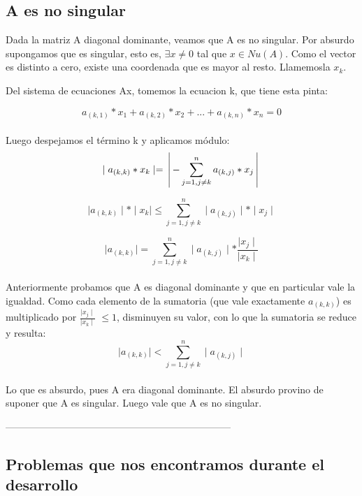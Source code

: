 \subsection{A es no singular}
Dada la matriz A diagonal dominante, veamos que A es no singular.
Por absurdo supongamos que es singular, esto es, $\exists x\neq 0$ tal que $x \in Nu(A)$.
Como el vector es distinto a cero, existe una coordenada que es mayor al resto. Llamemosla $x_{k}$.


Del sistema de ecuaciones Ax, tomemos la ecuacion k, que tiene esta pinta:                  

$$ a_{(k, 1)} * x_{1} + a_{(k, 2)} * x_{2} +... + a_{(k, n)} * x_{n} = 0 $$\\

Luego despejamos el término k y aplicamos módulo:\\

 $$ \mid a_{(k, k)} * x_{k} \mid  =  \left \arrowvert - \sum_{j=1,j\neq k}^{n}  a_{(k,j)} * x_{j} \right \arrowvert $$

 $$ \mid a_{(k, k)}\mid * \mid x_{k} \mid \leq \sum_{j=1,j\neq k}^{n} \mid a_{(k,j)}\mid * \mid x_{j} \mid $$


 $$ \mid a_{(k, k)}\mid  = \sum_{j=1,j\neq k}^{n} \mid a_{(k,j)}\mid *  \frac{\mid x_{j} \mid}{\mid x_{k} \mid}$$\\

Anteriormente probamos que A es diagonal dominante y que en particular vale la igualdad. Como cada elemento de la sumatoria (que vale exactamente $a_{(k, k)}$) es multiplicado por $\frac{\mid x_{j} \mid}{\mid x_{k} \mid}$ $\leq 1$, disminuyen su valor, con lo que la sumatoria se reduce y resulta:\\

$$\mid a_{(k,k)} \mid < \sum_{j=1, j\neq k}^{n}\mid a_{(k,j)} \mid $$\\

Lo que es absurdo, pues A era diagonal dominante. El absurdo provino de suponer que A es singular. Luego vale que A es no singular.




---------------------------------------------------------------------

\subsection{Problemas que nos encontramos durante el desarrollo}

